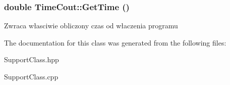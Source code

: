 \hypertarget{classTimeCout_ad88edc4a3eccda520f2bdf7d69f852b9}{
\subsubsection[{GetTime}]{\setlength{\rightskip}{0pt plus 5cm}double TimeCout::GetTime ()}}
\label{classTimeCout_ad88edc4a3eccda520f2bdf7d69f852b9}


Zwraca własciwie obliczony czas od właczenia programu 



The documentation for this class was generated from the following files:\begin{DoxyCompactItemize}
\item 
SupportClass.hpp\item 
SupportClass.cpp\end{DoxyCompactItemize}
